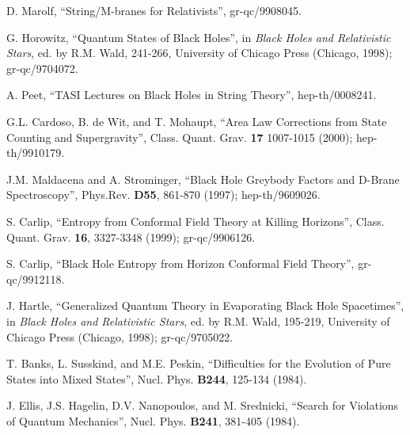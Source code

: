 \documentclass[12pt]{article}
\newcommand{\comment}[1]{}
\newcommand{\keywords}[1]{}
\begin{document}
\begin{thebibliography}{999}
\comment{online} D. Marolf, ``String/M-branes for
Relativists'', gr-qc/9908045.  \keywords{string theory, quantum
gravity}

\comment{inbook} G. Horowitz, ``Quantum States of Black
Holes'', in {\it Black Holes and Relativistic Stars}, ed. by
R.M. Wald, 241-266, University of Chicago Press (Chicago, 1998);
gr-qc/9704072.  \keywords{black hole thermodynamics, string theory,
entropy, quantum gravity}

\comment{online} A. Peet, ``TASI Lectures on Black Holes
in String Theory'', hep-th/0008241. \keywords{black hole
thermodynamics, string theory, entropy, quantum gravity}

\comment{online} G.L. Cardoso, B. de Wit, and T. Mohaupt,
``Area Law Corrections from State Counting and Supergravity'',
Class. Quant. Grav. {\bf 17} 1007-1015 (2000); hep-th/9910179.
\keywords{black hole thermodynamics, string theory, entropy, quantum
gravity}

\comment{article} J.M. Maldacena and A. Strominger,
``Black Hole Greybody Factors and D-Brane Spectroscopy'',
Phys.Rev. {\bf D55}, 861-870 (1997); hep-th/9609026.  \keywords{black
holes, string theory}

\comment{article} S. Carlip, ``Entropy from Conformal
Field Theory at Killing Horizons'', Class. Quant. Grav. {\bf 16},
3327-3348 (1999); gr-qc/9906126.  \keywords{black hole thermodynamics,
entropy, quantum gravity}

\comment{online} S. Carlip, ``Black Hole Entropy from
Horizon Conformal Field Theory'', gr-qc/9912118.  \keywords{black hole
thermodynamics, entropy, quantum gravity}

\comment{inbook} J. Hartle, ``Generalized Quantum Theory
in Evaporating Black Hole Spacetimes'', in {\it Black Holes and
Relativistic Stars}, ed. by R.M. Wald, 195-219, University of Chicago
Press (Chicago, 1998); gr-qc/9705022. \keywords{black hole
thermodynamics, quantum gravity}

\comment{article} T. Banks, L. Susskind, and M.E. Peskin,
``Difficulties for the Evolution of Pure States into Mixed States'',
Nucl. Phys. {\bf B244}, 125-134 (1984).  \keywords{black hole
thermodynamics, quantum gravity}

\comment{article} J. Ellis, J.S. Hagelin,
D.V. Nanopoulos, and M. Srednicki, ``Search for Violations of Quantum
Mechanics'', Nucl. Phys. {\bf B241}, 381-405 (1984).  \keywords{black
hole thermodynamics, quantum gravity}


\end{thebibliography}
\end{document}
